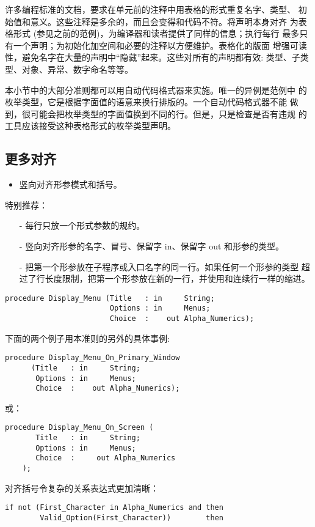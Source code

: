 许多编程标准的文档，要求在单元前的注释中用表格的形式重复名字、类型、
初始值和意义。这些注释是多余的，而且会变得和代码不符。将声明本身对齐
为表格形式 (参见之前的范例)，为编译器和读者提供了同样的信息；执行每行
最多只有一个声明；为初始化加空间和必要的注释以方便维护。表格化的版面
增强可读性，避免名字在大量的声明中``隐藏''起来。这些对所有的声明都有效:
类型、子类型、对象、异常、数字命名等等。

\begin{blockindent}
本小节中的大部分准则都可以用自动代码格式器来实施。唯一的异例是范例中
的枚举类型，它是根据字面值的语意来换行排版的。一个自动代码格式器不能
做到，很可能会把枚举类型的字面值换到不同的行。但是，只是检查是否有违规
的工具应该接受这种表格形式的枚举类型声明。
\end{blockindent}

\subsection{更多对齐}
\begin{itemize}
    \item 竖向对齐形参模式和括号。
\end{itemize}

\begin{blockindent}
特别推荐：
\begin{itemize}
    \item[-] 每行只放一个形式参数的规约。
    \item[-] 竖向对齐形参的名字、冒号、保留字 in、保留字 out 和形参的类型。
    \item[-] 把第一个形参放在子程序或入口名字的同一行。如果任何一个形参的类型
超过了行长度限制，把第一个形参放在新的一行，并使用和连续行一样的缩进。
\end{itemize}
\end{blockindent}

\begin{blockindent}
\noindent
\begin{lstlisting}
procedure Display_Menu (Title   : in     String;
                        Options : in     Menus;
                        Choice  :    out Alpha_Numerics);
\end{lstlisting}
下面的两个例子用本准则的另外的具体事例:
\begin{lstlisting}
procedure Display_Menu_On_Primary_Window
      (Title   : in     String;
       Options : in     Menus;
       Choice  :    out Alpha_Numerics);
\end{lstlisting}
或：
\begin{lstlisting}
procedure Display_Menu_On_Screen (
       Title   : in     String;
       Options : in     Menus;
       Choice  :     out Alpha_Numerics
    );
\end{lstlisting}
对齐括号令复杂的关系表达式更加清晰：
\begin{lstlisting}
if not (First_Character in Alpha_Numerics and then
        Valid_Option(First_Character))        then
\end{lstlisting}
\end{blockindent}


